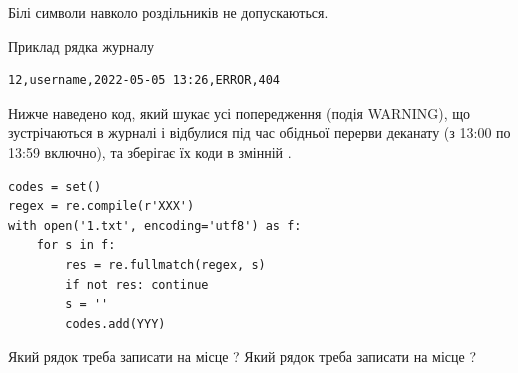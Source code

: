 \documentclass[12pt, ukrainian]{article}
\begin{document}
{Білі символи навколо роздільників не допускаються.

Приклад рядка журналу



\begin{verbatim}
12,username,2022-05-05 13:26,ERROR,404
\end{verbatim}


Нижче наведено код, який шукає усі попередження (подія WARNING), що зустрі\-ча\-ються в журналі і відбулися під час обідньої перерви деканату (з 13:00 по 13:59 включно), та зберігає їх коди в змінній .



\begin{verbatim}
codes = set()
regex = re.compile(r'XXX')
with open('1.txt', encoding='utf8') as f:
    for s in f:
        res = re.fullmatch(regex, s)
        if not res: continue
        s = ''
        codes.add(YYY)
\end{verbatim}





Який рядок треба записати на місце  ?
Який рядок треба записати на місце  ?\par

}
\end{document}
